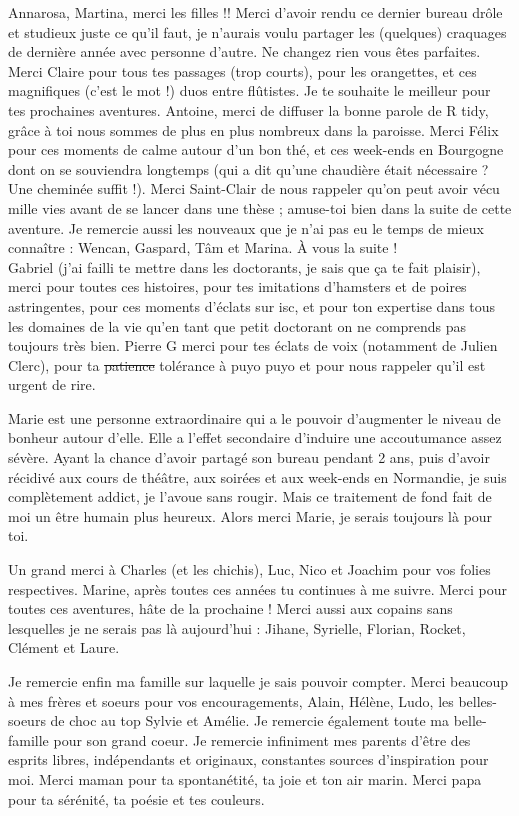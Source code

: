 Annarosa, Martina, merci les filles !! Merci d'avoir rendu ce dernier bureau drôle et studieux juste ce qu'il faut, je n'aurais voulu partager les (quelques) craquages de dernière année avec personne d'autre. Ne changez rien vous êtes parfaites. Merci Claire pour tous tes passages (trop courts), pour les orangettes, et ces magnifiques (c'est le mot !) duos entre flûtistes. Je te souhaite le meilleur pour tes prochaines aventures. Antoine, merci de diffuser la bonne parole de R tidy, grâce à toi nous sommes de plus en plus nombreux dans la paroisse. Merci Félix pour ces moments de calme autour d'un bon thé, et ces week-ends en Bourgogne dont on se souviendra longtemps (qui a dit qu'une chaudière était nécessaire ? Une cheminée suffit !). Merci Saint-Clair de nous rappeler qu'on peut avoir vécu mille vies avant de se lancer dans une thèse ; amuse-toi bien dans la suite de cette aventure. Je remercie aussi les nouveaux que je n'ai pas eu le temps de mieux connaître : Wencan, Gaspard, Tâm et Marina. À vous la suite ! \\
Gabriel (j'ai failli te mettre dans les doctorants, je sais que ça te fait plaisir), merci pour toutes ces histoires, pour tes imitations d'hamsters et de poires astringentes, pour ces moments d'éclats sur isc, et pour ton expertise dans tous les domaines de la vie qu'en tant que petit doctorant on ne comprends pas toujours très bien. Pierre G merci pour tes éclats de voix (notamment de Julien Clerc), pour ta \sout{patience} tolérance à puyo puyo et pour nous rappeler qu'il est urgent de rire.  


Marie est une personne extraordinaire qui a le pouvoir d'augmenter le niveau de bonheur autour d'elle. Elle a l'effet secondaire d'induire une accoutumance assez sévère. Ayant la chance d'avoir partagé son bureau pendant 2 ans, puis d'avoir récidivé aux cours de théâtre, aux soirées et aux week-ends en Normandie, je suis complètement addict, je l'avoue sans rougir. Mais ce traitement de fond fait de moi un être humain plus heureux.  Alors merci Marie, je serais toujours là pour toi. 


Un grand merci à Charles (et les chichis), Luc, Nico et Joachim pour vos folies respectives. Marine, après toutes ces années tu continues à me suivre. Merci pour toutes ces aventures, hâte de la prochaine ! Merci aussi aux copains sans lesquelles je ne serais pas là aujourd'hui :  Jihane, Syrielle, Florian, Rocket, Clément et Laure.


Je remercie enfin ma famille sur laquelle je sais pouvoir compter. Merci beaucoup à mes frères et soeurs pour vos encouragements, Alain, Hélène, Ludo, les belles-soeurs de choc au top Sylvie et Amélie. Je remercie également toute ma belle-famille pour son grand coeur.  Je remercie infiniment mes parents d'être des esprits libres, indépendants et originaux, constantes sources d'inspiration pour moi. Merci maman pour ta spontanétité, ta joie et ton air marin. Merci papa pour ta sérénité, ta poésie et tes couleurs.


